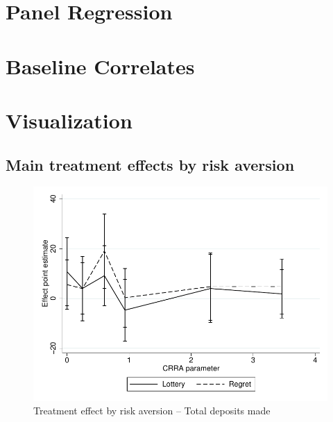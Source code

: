 \documentclass[11pt]{article}
\begin{document}
\section{Panel Regression}

    
    
    

\clearpage

\section{Baseline Correlates}

    
    

\clearpage

\section{Visualization}

	\subsection{Main treatment effects by risk aversion}

		\begin{figure}[ht]
		\centering
		\caption{Treatment effect by risk aversion -- Total deposits made}
		\includegraphics[width=\textwidth]{../../figures/line-mobile_totdepositsbyrisk.pdf}
		\end{figure}

	\clearpage
\end{document}
